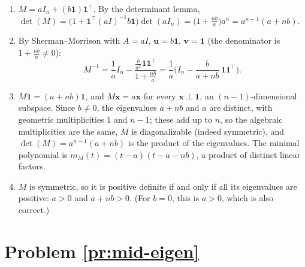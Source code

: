 \documentclass[11pt]{article}
\begin{document}
\begin{enumerate}[label=(\alph*)]
    \item $M = aI_n + (b\mathbf{1})\mathbf{1}^\top$. By the determinant lemma, $\det(M) = \big(1 + \mathbf{1}^\top (aI)^{-1} b\mathbf{1}\big)\det(aI_n) = \big(1 + \frac{nb}{a}\big)a^n = a^{n-1}(a + nb)$.
    \item By Sherman--Morrison with $A = aI$, $\mathbf{u} = b\mathbf{1}$, $\mathbf{v} = \mathbf{1}$ (the denominator is $1 + \frac{nb}{a} \neq 0$):
    \[M^{-1} = \frac{1}{a}I_n - \frac{\frac{b}{a^2}\mathbf{1}\mathbf{1}^\top}{1 + \frac{nb}{a}} = \frac{1}{a}\Big(I_n - \frac{b}{a + nb}\,\mathbf{1}\mathbf{1}^\top\Big).\]
    \item $M\mathbf{1} = (a + nb)\mathbf{1}$, and $M\mathbf{x} = a\mathbf{x}$ for every $\mathbf{x} \perp \mathbf{1}$, an $(n - 1)$-dimensional subspace. Since $b \neq 0$, the eigenvalues $a + nb$ and $a$ are distinct, with geometric multiplicities $1$ and $n - 1$; these add up to $n$, so the algebraic multiplicities are the same, $M$ is diagonalizable (indeed symmetric), and $\det(M) = a^{n-1}(a + nb)$ is the product of the eigenvalues. The minimal polynomial is $m_M(t) = (t - a)(t - a - nb)$, a product of distinct linear factors.
    \item $M$ is symmetric, so it is positive definite if and only if all its eigenvalues are positive: $a > 0$ and $a + nb > 0$. (For $b = 0$, this is $a > 0$, which is also correct.)
\end{enumerate}

\section*{Problem \ref{pr:mid-eigen}}
\end{document}
